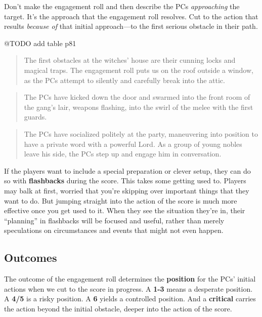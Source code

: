 \documentclass[11pt,oneside]{book}
\newcommand{\gameterm}[1]{\textbf{#1}}
\begin{document}
Don’t make the engagement roll and then describe the PCs \emph{approaching} the target. It’s the approach that the engagement roll resolves. Cut to the action that results \emph{because of} that initial approach---to the first serious obstacle in their path.

@TODO add table p81

\begin{quote}
	The first obstacles at the witches’ house are their cunning locks and magical traps. The engagement roll puts us on the roof outside a window, as the PCs attempt to silently and carefully break into the attic.
\end{quote} 

\begin{quote}
	The PCs have kicked down the door and swarmed into the front room of the gang’s lair, weapons flashing, into the swirl of the melee with the first guards.
\end{quote} 

\begin{quote}
	The PCs have socialized politely at the party, maneuvering into position to have a private word with a powerful Lord. As a group of young nobles leave his side, the PCs step up and engage him in conversation.
\end{quote} 

If the players want to include a special preparation or clever setup, they can do so with \textbf{flashbacks} during the score. This takes some getting used to. Players may balk at first, worried that you’re skipping over important things that they want to do. But jumping straight into the action of the score is much more effective once you get used to it. When they see the situation they’re in, their “planning” in flashbacks will be focused and useful, rather than merely speculations on circumstances and events that might not even happen.

\subsection{Outcomes}

The outcome of the engagement roll determines the \textbf{position} for the PCs’ initial actions when we cut to the score in progress. A \gameterm{1-3}  means a desperate position. A \gameterm{4/5}  is a risky position. A \gameterm{6}  yields a controlled position. And a \gameterm{critical}  carries the action beyond the initial obstacle, deeper into the action of the score.
\end{document}
